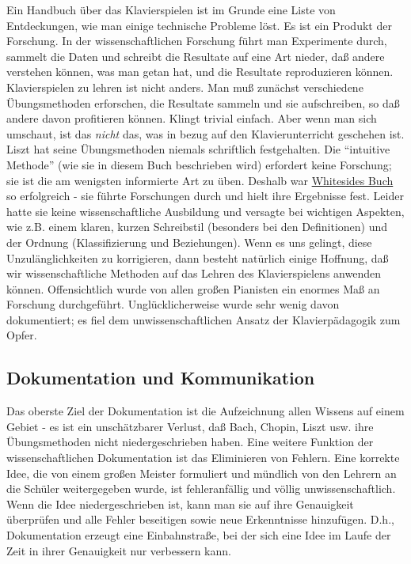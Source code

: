 Ein Handbuch über das Klavierspielen ist im Grunde eine Liste von Entdeckungen, wie man einige technische Probleme löst.
Es ist ein Produkt der Forschung.
In der wissenschaftlichen Forschung führt man Experimente durch, sammelt die Daten und schreibt die Resultate auf eine Art nieder, daß andere verstehen können, was man getan hat, und die Resultate reproduzieren können.
Klavierspielen zu lehren ist nicht anders.
Man muß zunächst verschiedene Übungsmethoden erforschen, die Resultate sammeln und sie aufschreiben, so daß andere davon profitieren können.
Klingt trivial einfach.
Aber wenn man sich umschaut, ist das \textit{nicht} das, was in bezug auf den Klavierunterricht geschehen ist.
Liszt hat seine Übungsmethoden niemals schriftlich festgehalten.
Die \enquote{intuitive Methode} (wie sie in diesem Buch beschrieben wird) erfordert keine Forschung; sie ist die am wenigsten informierte Art zu üben.
Deshalb war \hyperref[Whiteside]{Whitesides Buch} so erfolgreich - sie führte Forschungen durch und hielt ihre Ergebnisse fest.
Leider hatte sie keine wissenschaftliche Ausbildung und versagte bei wichtigen Aspekten, wie z.B. einem klaren, kurzen Schreibstil (besonders bei den Definitionen) und der Ordnung (Klassifizierung und Beziehungen).
Wenn es uns gelingt, diese Unzulänglichkeiten zu korrigieren, dann besteht natürlich einige Hoffnung, daß wir wissenschaftliche Methoden auf das Lehren des Klavierspielens anwenden können.
Offensichtlich wurde von allen großen Pianisten ein enormes Maß an Forschung durchgeführt.
Unglücklicherweise wurde sehr wenig davon dokumentiert; es fiel dem unwissenschaftlichen Ansatz der Klavierpädagogik zum Opfer.


\subsection{Dokumentation und Kommunikation}
\label{c3_3d}

Das oberste Ziel der Dokumentation ist die Aufzeichnung allen Wissens auf einem Gebiet - es ist ein unschätzbarer Verlust, daß Bach, Chopin, Liszt usw. ihre Übungsmethoden nicht niedergeschrieben haben.
Eine weitere Funktion der wissenschaftlichen Dokumentation ist das Eliminieren von Fehlern.
Eine korrekte Idee, die von einem großen Meister formuliert und mündlich von den Lehrern an die Schüler weitergegeben wurde, ist fehleranfällig und völlig unwissenschaftlich.
Wenn die Idee niedergeschrieben ist, kann man sie auf ihre Genauigkeit überprüfen und alle Fehler beseitigen sowie neue Erkenntnisse hinzufügen.
D.h., Dokumentation erzeugt eine Einbahnstraße, bei der sich eine Idee im Laufe der Zeit in ihrer Genauigkeit nur verbessern kann.


